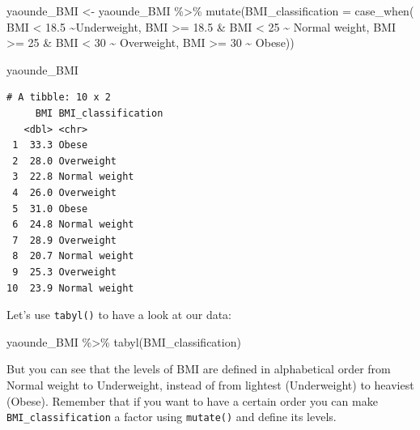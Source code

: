 \documentclass[
  letterpaper,
  DIV=11,
  numbers=noendperiod]{scrreprt}
\newenvironment{Shaded}{\begin{snugshade}}{\end{snugshade}}
\newcommand{\AttributeTok}[1]{\textcolor[rgb]{0.40,0.45,0.13}{#1}}
\newcommand{\DecValTok}[1]{\textcolor[rgb]{0.68,0.00,0.00}{#1}}
\newcommand{\FloatTok}[1]{\textcolor[rgb]{0.68,0.00,0.00}{#1}}
\newcommand{\FunctionTok}[1]{\textcolor[rgb]{0.28,0.35,0.67}{#1}}
\newcommand{\NormalTok}[1]{\textcolor[rgb]{0.00,0.23,0.31}{#1}}
\newcommand{\OtherTok}[1]{\textcolor[rgb]{0.00,0.23,0.31}{#1}}
\newcommand{\SpecialCharTok}[1]{\textcolor[rgb]{0.37,0.37,0.37}{#1}}
\newcommand{\StringTok}[1]{\textcolor[rgb]{0.13,0.47,0.30}{#1}}
\begin{document}
\begin{Shaded}
\begin{Highlighting}[]
\NormalTok{yaounde\_BMI }\OtherTok{\textless{}{-}}
\NormalTok{  yaounde\_BMI }\SpecialCharTok{\%\textgreater{}\%}
  \FunctionTok{mutate}\NormalTok{(}\AttributeTok{BMI\_classification =} \FunctionTok{case\_when}\NormalTok{(}
\NormalTok{    BMI }\SpecialCharTok{\textless{}} \FloatTok{18.5} \SpecialCharTok{\textasciitilde{}}\StringTok{\textquotesingle{}Underweight\textquotesingle{}}\NormalTok{,}
\NormalTok{    BMI }\SpecialCharTok{\textgreater{}=} \FloatTok{18.5} \SpecialCharTok{\&}\NormalTok{ BMI }\SpecialCharTok{\textless{}} \DecValTok{25} \SpecialCharTok{\textasciitilde{}} \StringTok{\textquotesingle{}Normal weight\textquotesingle{}}\NormalTok{,}
\NormalTok{    BMI }\SpecialCharTok{\textgreater{}=} \DecValTok{25} \SpecialCharTok{\&}\NormalTok{ BMI }\SpecialCharTok{\textless{}} \DecValTok{30} \SpecialCharTok{\textasciitilde{}} \StringTok{\textquotesingle{}Overweight\textquotesingle{}}\NormalTok{,}
\NormalTok{    BMI }\SpecialCharTok{\textgreater{}=} \DecValTok{30} \SpecialCharTok{\textasciitilde{}} \StringTok{\textquotesingle{}Obese\textquotesingle{}}\NormalTok{))}

\NormalTok{yaounde\_BMI}
\end{Highlighting}
\end{Shaded}

\begin{verbatim}
# A tibble: 10 x 2
     BMI BMI_classification
   <dbl> <chr>             
 1  33.3 Obese             
 2  28.0 Overweight        
 3  22.8 Normal weight     
 4  26.0 Overweight        
 5  31.0 Obese             
 6  24.8 Normal weight     
 7  28.9 Overweight        
 8  20.7 Normal weight     
 9  25.3 Overweight        
10  23.9 Normal weight     
\end{verbatim}

Let's use \texttt{tabyl()} to have a look at our data:

\begin{Shaded}
\begin{Highlighting}[]
\NormalTok{yaounde\_BMI }\SpecialCharTok{\%\textgreater{}\%}
  \FunctionTok{tabyl}\NormalTok{(BMI\_classification)}
\end{Highlighting}
\end{Shaded}

But you can see that the levels of BMI are defined in alphabetical order
from Normal weight to Underweight, instead of from lightest
(Underweight) to heaviest (Obese). Remember that if you want to have a
certain order you can make \texttt{BMI\_classification} a factor using
\texttt{mutate()} and define its levels.
\end{document}
